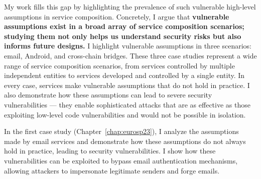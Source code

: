 \begin{dissertationintroduction}


My work fills this gap by highlighting the prevalence of such vulnerable high-level assumptions in service composition. Concretely, I argue that \textbf{vulnerable assumptions exist in a broad array of service composition scenarios; studying them not only helps us understand security risks but also informs future designs.}
I highlight vulnerable assumptions in three scenarios: email, Android, and cross-chain bridges.
These three case studies represent a wide range of service composition scenarios, from services controlled by multiple independent entities to services developed and controlled by a single entity. In every case, services make vulnerable assumptions that do not hold in practice. I also demonstrate how these assumptions can lead to severe security vulnerabilities --- they enable sophisticated attacks that are as effective as those exploiting low-level code vulnerabilities and would not be possible in isolation. 





In the first case study (Chapter~\ref{chap:eurosp23}), I analyze the assumptions made by email services and demonstrate how these assumptions do not always hold in practice, leading to security vulnerabilities. I show how these vulnerabilities can be exploited to bypass email authentication mechanisms, allowing attackers to impersonate legitimate senders and forge emails.


\end{dissertationintroduction}
